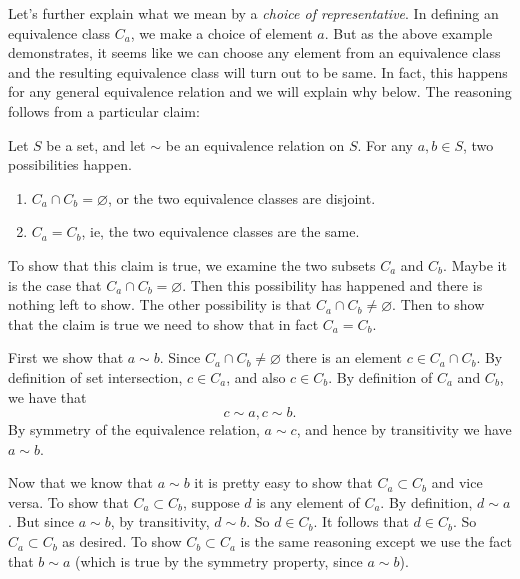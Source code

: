 Let's further explain what we mean by a \textit{choice of representative}. In defining an equivalence class $C_a$, we make a choice of element $a$. But as the above example demonstrates, it seems like we can choose any element from an equivalence class and the resulting equivalence class will turn out to be same. In fact, this happens for any general equivalence relation and we will explain why below. The reasoning follows from a particular claim:

\begin{proposition}
Let $S$ be a set, and let $\sim$ be an equivalence relation on $S$. For any $a, b \in S$, two possibilities happen.
\begin{enumerate}
	\item $C_a \cap C_b = \varnothing$, or the two equivalence classes are disjoint.
	\item $C_a = C_b$, ie, the two equivalence classes are the same. 
\end{enumerate}
\end{proposition}

To show that this claim is true, we examine the two subsets $C_a$ and $C_b$. Maybe it is the case that $C_a \cap C_b = \varnothing$. Then this possibility has happened and there is nothing left to show. The other possibility is that $C_a \cap C_b \neq \varnothing$. Then to show that the claim is true we need to show that in fact $C_a = C_b$.

First we show that $a \sim b$. Since $C_a \cap C_b \neq \varnothing$ there is an element $c \in C_a \cap C_b$. By definition of set intersection, $c \in C_a$, and also $c \in C_b$. By definition of $C_a$ and $C_b$, we have that 
\[c \sim a, c \sim b.\]
By symmetry of the equivalence relation, $a \sim c$, and hence by transitivity we have $a \sim b$.

Now that we know that $a \sim b$ it is pretty easy to show that $C_a \subset C_b$ and vice versa. To show that $C_a \subset C_b$, suppose $d$ is any element of $C_a$. By definition, $d \sim a$. But since $a \sim b$, by transitivity, $d \sim b$. So $d \in C_b$. It follows that $d \in C_b$. So $C_a \subset C_b$ as desired. To show $C_b \subset C_a$ is the same reasoning except we use the fact that $b \sim a$ (which is true by the symmetry property, since $a \sim b$).

